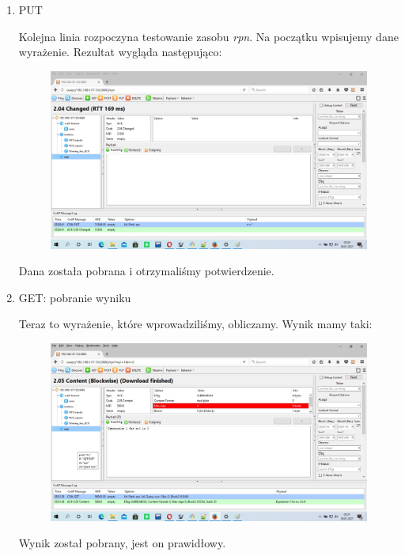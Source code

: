 \begin{enumerate}
\item  PUT

Kolejna linia rozpoczyna testowanie zasobu \textit{rpn}. Na początku wpisujemy dane wyrażenie. Rezultat wygląda następująco:

\begin{figure}[h]
    \includegraphics[scale=0.4]{img/rpn_put.jpg}
\end{figure}
\vspace{0.5cm}

Dana została pobrana i otrzymaliśmy potwierdzenie.

\item GET: pobranie wyniku

Teraz to wyrażenie, które wprowadziliśmy, obliczamy. Wynik mamy taki:

\begin{figure}[h]
    \includegraphics[scale=0.4]{img/rpn_get_wynik.jpg}
\end{figure}
\vspace{0.5cm}

Wynik został pobrany, jest on prawidłowy.


\end{enumerate}
